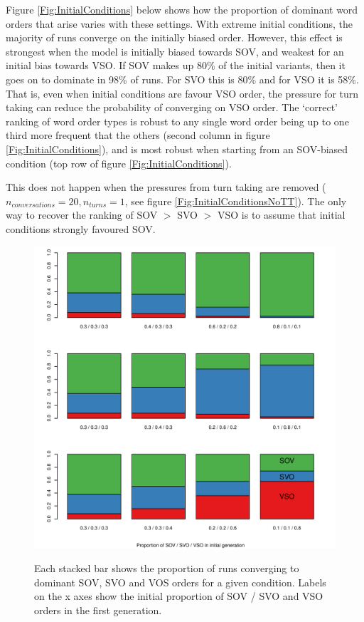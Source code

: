 \documentclass[12pt]{article}
\begin{document}
Figure \ref{Fig:InitialConditions} below shows how the proportion of dominant word orders that arise varies with these settings.  With extreme initial conditions, the majority of runs converge on the initially biased order. However, this effect is strongest when the model is initially biased towards SOV, and weakest for an initial bias towards VSO.  If SOV makes up 80\% of the initial variants, then it goes on to dominate in 98\% of runs.  For SVO this is 80\% and for VSO it is 58\%.  That is, even when initial conditions are favour VSO order, the pressure for turn taking can reduce the probability of converging on VSO order.  The `correct' ranking of word order types is robust to any single word order being up to one third more frequent that the others (second column in figure \ref{Fig:InitialConditions}), and is most robust when starting from an SOV-biased condition (top row of figure \ref{Fig:InitialConditions}). 

This does not happen when the pressures from turn taking are removed ($n_{conversations} = 20, n_{turns} = 1$, see figure \ref{Fig:InitialConditionsNoTT}).  The only way to recover the ranking of SOV $>$ SVO $>$ VSO is to assume that initial conditions strongly favoured SOV.

\begin{figure}[htbp]
\begin{center}
\includegraphics[width=\linewidth]{../images/pdf/InitialConditions.pdf}
\caption{Each stacked bar shows the proportion of runs converging to dominant SOV, SVO and VOS orders for a given condition.  Labels on the x axes show the initial proportion of SOV / SVO and VSO orders in the first generation.}
\label{Fig:InitialConditions}
\label{default}
\end{center}
\end{figure}
\end{document}
